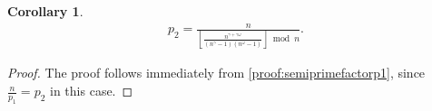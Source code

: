 \documentclass[11pt,reqno]{article}
\theoremstyle{plain}
\newtheorem{corollary}[theorem]{Corollary}
\theoremstyle{definition}
\newcommand{\floor}[1]{\left\lfloor #1 \right\rfloor}
\begin{document}
\begin{corollary} \label{proof:semiprimefactorp2}
\begin{align*}
p_2 = \frac{n}{\floor{\frac{n^{\gamma+\gamma\omega}}{(n^\gamma-1)(n^\omega-1)}}\bmod n}.
\end{align*}
\end{corollary}
\begin{proof}
The proof follows immediately from \cref{proof:semiprimefactorp1}, since $\frac{n}{p_1} = p_2$ in this case.
\end{proof}

\begingroup
\raggedright


\endgroup
\end{document}
